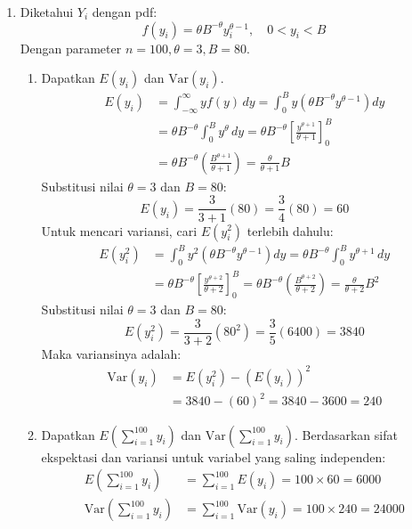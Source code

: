 \documentclass[11pt,letterpaper]{article}
\begin{document}
\begin{enumerate}
  \item
  Diketahui $Y_i$ dengan pdf:
  \[ f(y_i) = \theta B^{-\theta} y_i^{\theta-1}, \quad 0 < y_i < B \]
  Dengan parameter $n = 100, \theta = 3, B = 80$.
  \begin{enumerate}[label=\alph*)]
    \item Dapatkan $E(y_i)$ dan $\text{Var}(y_i)$.
    \begin{align*}
      E(y_i) &= \int_{-\infty}^{\infty} y f(y) \,dy = \int_0^B y \left( \theta B^{-\theta} y^{\theta-1} \right) dy \\
      &= \theta B^{-\theta} \int_0^B y^\theta \,dy = \theta B^{-\theta} \left[ \frac{y^{\theta+1}}{\theta+1} \right]_0^B \\
      &= \theta B^{-\theta} \left( \frac{B^{\theta+1}}{\theta+1} \right) = \frac{\theta}{\theta+1} B
    \end{align*}
    Substitusi nilai $\theta = 3$ dan $B = 80$:
    \[ E(y_i) = \frac{3}{3+1} (80) = \frac{3}{4} (80) = 60 \]
    Untuk mencari variansi, cari $E(y_i^2)$ terlebih dahulu:
    \begin{align*}
      E(y_i^2) &= \int_0^B y^2 \left( \theta B^{-\theta} y^{\theta-1} \right) dy = \theta B^{-\theta} \int_0^B y^{\theta+1} \,dy \\
      &= \theta B^{-\theta} \left[ \frac{y^{\theta+2}}{\theta+2} \right]_0^B = \theta B^{-\theta} \left( \frac{B^{\theta+2}}{\theta+2} \right) = \frac{\theta}{\theta+2} B^2
    \end{align*}
    Substitusi nilai $\theta = 3$ dan $B = 80$:
    \[ E(y_i^2) = \frac{3}{3+2} (80^2) = \frac{3}{5} (6400) = 3840 \]
    Maka variansinya adalah:
    \begin{align*}
      \text{Var}(y_i) &= E(y_i^2) - (E(y_i))^2 \\
      &= 3840 - (60)^2 = 3840 - 3600 = 240
    \end{align*}

    \item Dapatkan $E\left( \sum_{i=1}^{100} y_i \right)$ dan $\text{Var}\left( \sum_{i=1}^{100} y_i \right)$.
    Berdasarkan sifat ekspektasi dan variansi untuk variabel yang saling independen:
    \begin{align*}
      E\left( \sum_{i=1}^{100} y_i \right) &= \sum_{i=1}^{100} E(y_i) = 100 \times 60 = 6000 \\
      \text{Var}\left( \sum_{i=1}^{100} y_i \right) &= \sum_{i=1}^{100} \text{Var}(y_i) = 100 \times 240 = 24000
    \end{align*}


\end{enumerate}
\end{enumerate}
\end{document}
